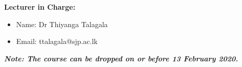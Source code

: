 \documentclass[a4paper,12pt]{article}
\begin{document}
\noindent\textbf{Lecturer in Charge:}

\begin{itemize}
	\setlength\itemsep{0.1mm}
	\item[] Name: Dr Thiyanga  Talagala
	\item[] Email: ttalagala@sjp.ac.lk
\end{itemize}


\noindent\textbf{\textit{Note: The course can be dropped on or before 13 February 2020.}}
\end{document}
